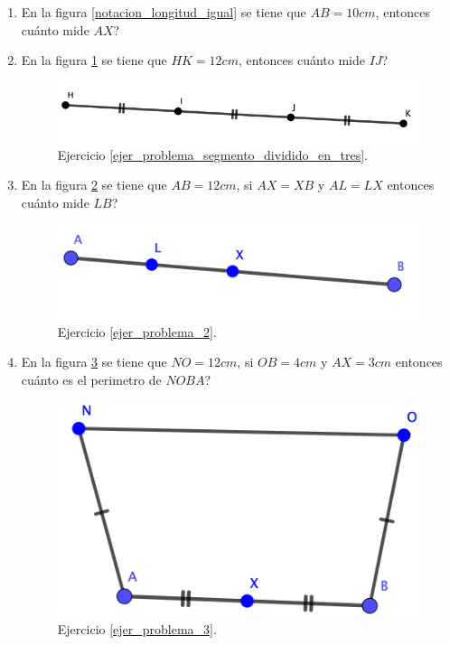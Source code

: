 \begin{enumerate} 
	\item  En la figura \ref{notacion_longitud_igual} se tiene que $AB=10cm$, entonces cuánto mide $AX$?
	\item\label{ejer_problema_segmento_dividido_en_tres} En la figura \ref{problema_segmento_dividido_en_tres} se tiene que $HK=12cm$, entonces cuánto mide $IJ$?
		
		\begin{figure}[H]
			\centering
			\includegraphics[width=0.8\linewidth]{Geometria/imgs/problema_segmento_dividido_en_tres}
			\caption{Ejercicio \ref{ejer_problema_segmento_dividido_en_tres}.}
			\label{problema_segmento_dividido_en_tres}
		\end{figure}
	\item \label{ejer_problema_2} En la figura \ref{problema_2} se tiene que $AB=12cm$, si $AX = XB$ y $AL=LX$ entonces cuánto mide $LB$?
		
		\begin{figure}[H]
			\centering
			\includegraphics[width=0.8\linewidth]{Geometria/imgs/problema_2}
			\caption{Ejercicio \ref{ejer_problema_2}.}
			\label{problema_2}
		\end{figure}
	
	\item \label{ejer_problema_3} En la figura \ref{problema_3} se tiene que $NO=12cm$, si $OB=4cm$ y $AX=3cm$ entonces cuánto es el perimetro de $NOBA$?
	
	\begin{figure}[H]
		\centering
		\includegraphics[width=0.6\linewidth]{Geometria/imgs/problema_3}
		\caption{Ejercicio \ref{ejer_problema_3}.}
		\label{problema_3}
	\end{figure}		
\end{enumerate}
\newpage

